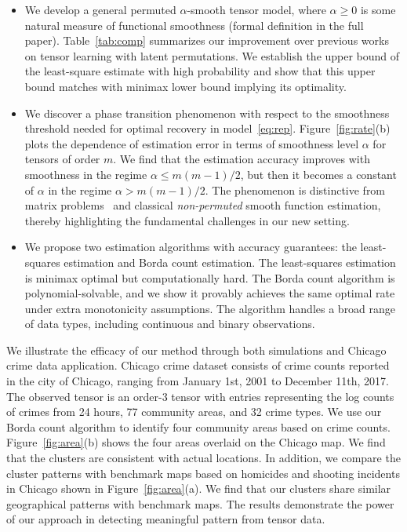 \documentclass[11pt]{article}
\theoremstyle{definition}
\begin{document}
\begin{itemize}[wide,labelwidth=0pt, labelindent=0pt,itemsep=.4ex,topsep=-2pt]
\item We develop a general permuted $\alpha$-smooth tensor model, where $\alpha\geq 0$ is some natural measure of functional smoothness (formal definition in the full paper). Table~\ref{tab:comp} summarizes our improvement over previous works on tensor learning with latent permutations.  We establish the upper bound of the least-square estimate with high probability and show that this upper bound matches with minimax lower bound implying its optimality. 
\vspace{-.2cm}
\item We discover a phase transition phenomenon with respect to the smoothness threshold needed for optimal recovery in model~\eqref{eq:rep}. 
Figure~\ref{fig:rate}(b) plots the dependence of estimation error in terms of smoothness level $\alpha$ for tensors of order $m$. We find that the estimation accuracy improves with smoothness in the regime $\alpha \leq m(m-1)/2$, but then it becomes a constant of $\alpha$ in the regime $ \alpha > m(m-1)/2$. The phenomenon is distinctive from matrix problems~\citep{klopp2017oracle} and classical \emph{non-permuted} smooth function estimation, thereby highlighting the fundamental challenges in our new setting. 
\vspace{-.2cm}
\item We propose two estimation algorithms with accuracy guarantees: the least-squares estimation and Borda count estimation. The least-squares estimation is minimax optimal but computationally hard. The Borda count algorithm is polynomial-solvable, and we show it provably achieves the same optimal rate under extra monotonicity assumptions. The algorithm handles a broad range of data types, including continuous and binary observations.\end{itemize}


We illustrate the efficacy of our method through both simulations and Chicago crime data application. Chicago crime dataset consists of crime counts reported in the city of Chicago, ranging from January 1st, 2001 to December 11th, 2017. The observed tensor is an order-3 tensor with entries representing the log counts of crimes from 24 hours, 77 community areas, and 32 crime types. We use our Borda count algorithm to identify four community areas based on crime counts. Figure~\ref{fig:area}(b) shows the four areas overlaid on the Chicago map. We find that the clusters are consistent with actual locations. In addition, we compare the cluster patterns with benchmark maps based on homicides and shooting incidents in Chicago shown in Figure~\ref{fig:area}(a). We find that our clusters share similar geographical patterns with benchmark maps. The results demonstrate the power of our approach in detecting meaningful pattern from tensor data. 
\end{document}
